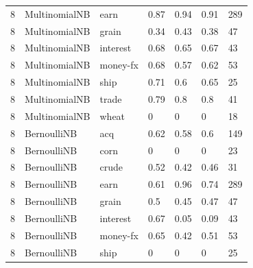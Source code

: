 \documentclass{article}
\begin{document}
\begin{table}[h]
\begin{tabular}{lllllll}
8             & MultinomialNB          & earn            & 0.87               & 0.94            & 0.91              & 289              \\
8             & MultinomialNB          & grain           & 0.34               & 0.43            & 0.38              & 47               \\
8             & MultinomialNB          & interest        & 0.68               & 0.65            & 0.67              & 43               \\
8             & MultinomialNB          & money-fx        & 0.68               & 0.57            & 0.62              & 53               \\
8             & MultinomialNB          & ship            & 0.71               & 0.6             & 0.65              & 25               \\
8             & MultinomialNB          & trade           & 0.79               & 0.8             & 0.8               & 41               \\
8             & MultinomialNB          & wheat           & 0                  & 0               & 0                 & 18               \\
8             & BernoulliNB            & acq             & 0.62               & 0.58            & 0.6               & 149              \\
8             & BernoulliNB            & corn            & 0                  & 0               & 0                 & 23               \\
8             & BernoulliNB            & crude           & 0.52               & 0.42            & 0.46              & 31               \\
8             & BernoulliNB            & earn            & 0.61               & 0.96            & 0.74              & 289              \\
8             & BernoulliNB            & grain           & 0.5                & 0.45            & 0.47              & 47               \\
8             & BernoulliNB            & interest        & 0.67               & 0.05            & 0.09              & 43               \\
8             & BernoulliNB            & money-fx        & 0.65               & 0.42            & 0.51              & 53               \\
8             & BernoulliNB            & ship            & 0                  & 0               & 0                 & 25               \\

\end{tabular}
\end{table}
\end{document}
